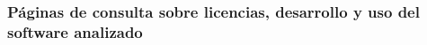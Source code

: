 
\printbibliography

\bigskip
\subsubsection{Páginas de consulta sobre licencias, desarrollo y uso del software analizado}

